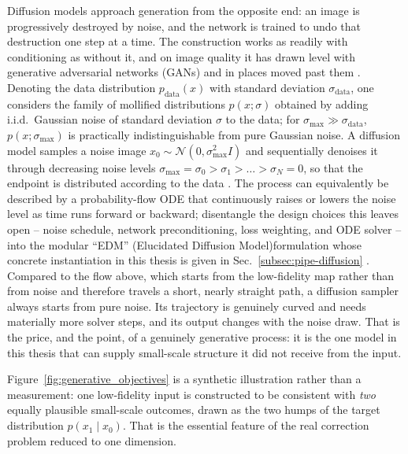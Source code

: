 \documentclass{report}
\begin{document}
Diffusion models \cite{ho_denoising_2020, song_score-based_2021} approach generation from the opposite end: an image is progressively destroyed by noise, and the network is trained to undo that destruction one step at a time. The construction works as readily with conditioning as without it, and on image quality it has drawn level with generative adversarial networks (GANs) and in places moved past them \cite{karras_elucidating_2022}. Denoting the data distribution $p_{\mathrm{data}}(x)$ with standard deviation $\sigma_{\mathrm{data}}$, one considers the family of mollified distributions $p(x;\sigma)$ obtained by adding i.i.d.\ Gaussian noise of standard deviation $\sigma$ to the data; for $\sigma_{\max}\gg\sigma_{\mathrm{data}}$, $p(x;\sigma_{\max})$ is practically indistinguishable from pure Gaussian noise. A diffusion model samples a noise image $x_0\sim\mathcal{N}(0,\sigma_{\max}^2 I)$ and sequentially denoises it through decreasing noise levels $\sigma_{\max}=\sigma_0>\sigma_1>\dots>\sigma_N=0$, so that the endpoint is distributed according to the data \cite{karras_elucidating_2022}. The process can equivalently be described by a probability-flow ODE that continuously raises or lowers the noise level as time runs forward or backward; \citeauthor{karras_elucidating_2022} \cite{karras_elucidating_2022} disentangle the design choices this leaves open -- noise schedule, network preconditioning, loss weighting, and ODE solver -- into the modular ``EDM'' (Elucidated Diffusion Model)formulation whose concrete instantiation in this thesis is given in Sec.~\ref{subsec:pipe-diffusion} \cite{karras_elucidating_2022}. Compared to the flow above, which starts from the low-fidelity map rather than from noise and therefore travels a short, nearly straight path, a diffusion sampler always starts from pure noise. Its trajectory is genuinely curved and needs materially more solver steps, and its output changes with the noise draw. That is the price, and the point, of a genuinely generative process: it is the one model in this thesis that can supply small-scale structure it did not receive from the input.

\vspace{0.5cm}
Figure~\ref{fig:generative_objectives} is a synthetic illustration rather than a measurement: one low-fidelity input is constructed to be consistent with \emph{two} equally plausible small-scale outcomes, drawn as the two humps of the target distribution \mbox{$p(x_1 \mid x_0)$}. That is the essential feature of the real correction problem reduced to one dimension.
\end{document}
